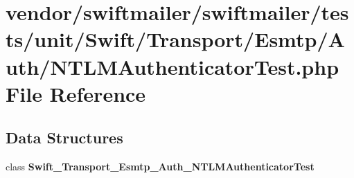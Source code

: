 \section{vendor/swiftmailer/swiftmailer/tests/unit/\+Swift/\+Transport/\+Esmtp/\+Auth/\+N\+T\+L\+M\+Authenticator\+Test.php File Reference}
\label{_n_t_l_m_authenticator_test_8php}
\subsection*{Data Structures}
\begin{DoxyCompactItemize}
\item 
class {\bf Swift\+\_\+\+Transport\+\_\+\+Esmtp\+\_\+\+Auth\+\_\+\+N\+T\+L\+M\+Authenticator\+Test}
\end{DoxyCompactItemize}
